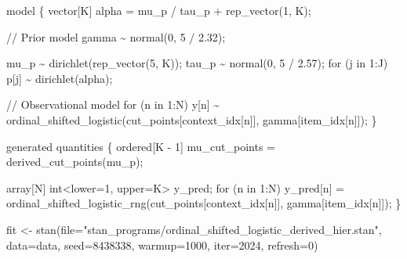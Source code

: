 \documentclass[
  letterpaper,
  DIV=11,
  numbers=noendperiod]{scrartcl}
\newenvironment{Shaded}{\begin{snugshade}}{\end{snugshade}}
\newcommand{\AttributeTok}[1]{\textcolor[rgb]{0.40,0.45,0.13}{#1}}
\newcommand{\CommentTok}[1]{\textcolor[rgb]{0.37,0.37,0.37}{#1}}
\newcommand{\ControlFlowTok}[1]{\textcolor[rgb]{0.00,0.23,0.31}{#1}}
\newcommand{\DataTypeTok}[1]{\textcolor[rgb]{0.68,0.00,0.00}{#1}}
\newcommand{\DecValTok}[1]{\textcolor[rgb]{0.68,0.00,0.00}{#1}}
\newcommand{\FloatTok}[1]{\textcolor[rgb]{0.68,0.00,0.00}{#1}}
\newcommand{\FunctionTok}[1]{\textcolor[rgb]{0.28,0.35,0.67}{#1}}
\newcommand{\KeywordTok}[1]{\textcolor[rgb]{0.00,0.23,0.31}{#1}}
\newcommand{\NormalTok}[1]{\textcolor[rgb]{0.00,0.23,0.31}{#1}}
\newcommand{\OtherTok}[1]{\textcolor[rgb]{0.00,0.23,0.31}{#1}}
\newcommand{\StringTok}[1]{\textcolor[rgb]{0.13,0.47,0.30}{#1}}
\begin{document}
\begin{codelisting}
\begin{Shaded}
\begin{Highlighting}[]
\KeywordTok{model}\NormalTok{ \{}
  \DataTypeTok{vector}\NormalTok{[K] alpha = mu\_p / tau\_p + rep\_vector(}\DecValTok{1}\NormalTok{, K);}

  \CommentTok{// Prior model}
\NormalTok{  gamma \textasciitilde{} normal(}\DecValTok{0}\NormalTok{, }\DecValTok{5}\NormalTok{ / }\FloatTok{2.32}\NormalTok{);}

\NormalTok{  mu\_p \textasciitilde{} dirichlet(rep\_vector(}\DecValTok{5}\NormalTok{, K));}
\NormalTok{  tau\_p \textasciitilde{} normal(}\DecValTok{0}\NormalTok{, }\DecValTok{5}\NormalTok{ / }\FloatTok{2.57}\NormalTok{);}
  \ControlFlowTok{for}\NormalTok{ (j }\ControlFlowTok{in} \DecValTok{1}\NormalTok{:J)}
\NormalTok{    p[j] \textasciitilde{} dirichlet(alpha);}

  \CommentTok{// Observational model}
  \ControlFlowTok{for}\NormalTok{ (n }\ControlFlowTok{in} \DecValTok{1}\NormalTok{:N)}
\NormalTok{    y[n] \textasciitilde{} ordinal\_shifted\_logistic(cut\_points[context\_idx[n]],}
\NormalTok{                                    gamma[item\_idx[n]]);}
\NormalTok{\}}

\KeywordTok{generated quantities}\NormalTok{ \{}
  \DataTypeTok{ordered}\NormalTok{[K {-} }\DecValTok{1}\NormalTok{] mu\_cut\_points = derived\_cut\_points(mu\_p);}

  \DataTypeTok{array}\NormalTok{[N] }\DataTypeTok{int}\NormalTok{\textless{}}\KeywordTok{lower}\NormalTok{=}\DecValTok{1}\NormalTok{, }\KeywordTok{upper}\NormalTok{=K\textgreater{} y\_pred;}
  \ControlFlowTok{for}\NormalTok{ (n }\ControlFlowTok{in} \DecValTok{1}\NormalTok{:N)}
\NormalTok{    y\_pred[n] = ordinal\_shifted\_logistic\_rng(cut\_points[context\_idx[n]],}
\NormalTok{                                             gamma[item\_idx[n]]);}
\NormalTok{\}}
\end{Highlighting}
\end{Shaded}

\end{codelisting}

\begin{Shaded}
\begin{Highlighting}[]
\NormalTok{fit }\OtherTok{\textless{}{-}} \FunctionTok{stan}\NormalTok{(}\AttributeTok{file=}\StringTok{"stan\_programs/ordinal\_shifted\_logistic\_derived\_hier.stan"}\NormalTok{,}
            \AttributeTok{data=}\NormalTok{data, }\AttributeTok{seed=}\DecValTok{8438338}\NormalTok{,}
            \AttributeTok{warmup=}\DecValTok{1000}\NormalTok{, }\AttributeTok{iter=}\DecValTok{2024}\NormalTok{, }\AttributeTok{refresh=}\DecValTok{0}\NormalTok{)}
\end{Highlighting}
\end{Shaded}
\end{document}
